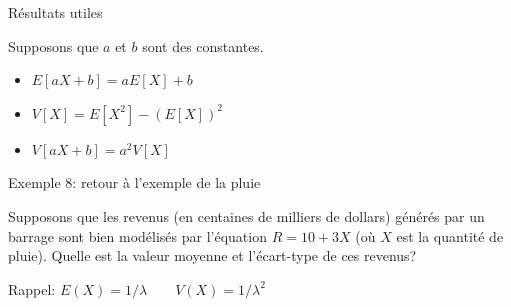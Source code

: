 \documentclass[handout]{BeamerTemplate}
\begin{document}
\begin{frame}[t]{Résultats utiles}

Supposons que $a$ et $b$ sont des constantes.

\begin{itemize}
\item<1-> $E[aX+b]=aE[X]+b$\ \ \ \ \

\vspace{0.45in}

\item<1-> $V[X]=E[X^2]-(E[X])^2$\ \ \ \ \

\vspace{0.75in}

\item<1-> $V[aX+b]=a^2V[X]$\ \ \ \ \
\end{itemize}
\end{frame}

\begin{frame}[t]{Exemple 8: retour à l'exemple de la pluie}

Supposons que les revenus (en centaines de milliers de dollars)
générés par un barrage sont bien modélisés par l'équation $R=10+3X$ (où $X$ est la quantité de pluie). Quelle est la valeur
moyenne et l'écart-type de ces revenus?

Rappel: $E(X)=1/\lambda\qquad V(X)=1/\lambda^2$
\end{frame}
\end{document}
